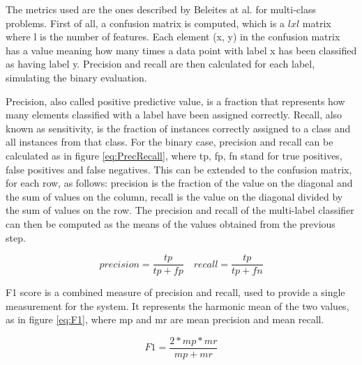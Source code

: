 \documentclass[12pt]{article}
\begin{document}
	The metrics used are the ones described by Beleites at al.\cite{MultilabelClassification} for multi-class problems. First of all, a confusion matrix is computed, which is a \(lxl\) matrix where l is the number of features. Each element (x, y) in the confusion matrix has a value meaning how many times a data point with label x has been classified as having label y. Precision and recall are then calculated for each label, simulating the binary evaluation. 
	
	Precision, also called positive predictive value, is a fraction that represents how many elements classified with a label have been assigned correctly. Recall, also known as sensitivity, is the fraction of instances correctly assigned to a class and all instances from that class. For the binary case, precision and recall can be calculated as in figure \ref{eq:PrecRecall}, where tp, fp, fn stand for true positives, false positives and false negatives. This can be extended to the confusion matrix, for each row, as follows: precision is the fraction of the value on the diagonal and the sum of values on the column, recall is the value on the diagonal divided by the sum of values on the row. The precision and recall of the multi-label classifier can then be computed as the means of the values obtained from the previous step.
	
	\begin{equation}
	\label{eq:PrecRecall}
	precision = \frac{tp}{tp + fp} \quad recall = \frac{tp}{tp + fn}
	\end{equation}
	
	F1 score is a combined measure of precision and recall, used to provide a single measurement for the system. It represents the harmonic mean of the two values, as in figure \ref{eq:F1}, where mp and mr are mean precision and mean recall.
	
	\begin{equation}
	\label{eq:F1}
	F1 = \frac{2 * mp * mr}{mp + mr}
	\end{equation}
	
	\newpage
	
	
\end{document}
